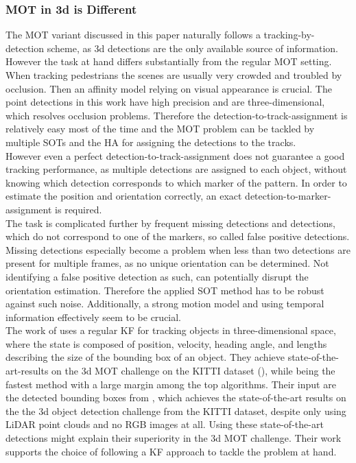 \documentclass[12pt,a4paper]{article}
\begin{document}
\subsubsection{MOT in 3d is Different}
The MOT variant discussed in this paper naturally follows a tracking-by-detection scheme, as 3d detections are the only available source of information. However the task at hand differs substantially from the regular MOT setting. When tracking pedestrians the scenes are usually very crowded and troubled by occlusion. Then an affinity model relying on visual appearance is crucial. The point detections in this work have high precision and are three-dimensional, which resolves occlusion problems. Therefore the detection-to-track-assignment is relatively easy most of the time and the MOT problem can be tackled by multiple SOTs and the HA for assigning the detections to the tracks.\\
However even a perfect detection-to-track-assignment does not guarantee a good tracking performance, as multiple detections are assigned to each object, without knowing which detection corresponds to which marker of the pattern. In order to estimate the position and orientation correctly, an exact detection-to-marker-assignment is required.\\
The task is complicated further by frequent missing detections and detections, which do not correspond to one of the markers, so called false positive detections. Missing detections especially become a problem when less than two detections are present for multiple frames, as no unique orientation can be determined. Not identifying a false positive detection as such, can potentially disrupt the orientation estimation. Therefore the applied SOT method has to be  robust against such noise. Additionally, a strong motion model and using temporal information effectively seem to be crucial. \\

The work of \cite{3d_kalman}  uses a regular KF for tracking objects in three-dimensional space, where the state is composed of position, velocity, heading angle, and lengths describing the size of the bounding box of an object. They achieve state-of-the-art-results on the 3d MOT challenge on the KITTI dataset (\cite{kitti}), while being the fastest method with a large margin among the top algorithms. Their input are the detected bounding boxes from \cite{PointRCNN}, which achieves the state-of-the-art results on the the 3d object detection challenge from the KITTI dataset, despite only using LiDAR point clouds and no RGB images at all. Using these state-of-the-art detections might explain their superiority in the 3d MOT challenge. Their work supports the choice of following a KF approach to tackle the problem at hand.
\end{document}
